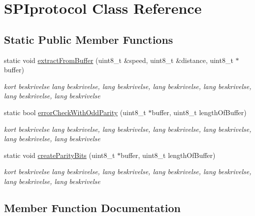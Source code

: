 \hypertarget{classSPIprotocol}{}\section{S\+P\+Iprotocol Class Reference}
\label{classSPIprotocol}
\subsection*{Static Public Member Functions}
\begin{DoxyCompactItemize}
\item 
static void \hyperlink{classSPIprotocol_ac1337db66f7bbe18a20b05b5d620ad6e}{extract\+From\+Buffer} (uint8\+\_\+t \&speed, uint8\+\_\+t \&distance, uint8\+\_\+t $\ast$buffer)
\begin{DoxyCompactList}\small\item\em kort beskrivelse lang beskrivelse, lang beskrivelse, lang beskrivelse, lang beskrivelse, lang beskrivelse, lang beskrivelse \end{DoxyCompactList}\item 
static bool \hyperlink{classSPIprotocol_aa263c4525c227602aa55d0fe34cd2d0e}{error\+Check\+With\+Odd\+Parity} (uint8\+\_\+t $\ast$buffer, uint8\+\_\+t length\+Of\+Buffer)
\begin{DoxyCompactList}\small\item\em kort beskrivelse lang beskrivelse, lang beskrivelse, lang beskrivelse, lang beskrivelse, lang beskrivelse, lang beskrivelse \end{DoxyCompactList}\item 
static void \hyperlink{classSPIprotocol_acaad712748b9671d4d5537ce27d3ecc6}{create\+Parity\+Bits} (uint8\+\_\+t $\ast$buffer, uint8\+\_\+t length\+Of\+Buffer)
\begin{DoxyCompactList}\small\item\em kort beskrivelse lang beskrivelse, lang beskrivelse, lang beskrivelse, lang beskrivelse, lang beskrivelse, lang beskrivelse \end{DoxyCompactList}\end{DoxyCompactItemize}


\subsection{Member Function Documentation}
\mbox{\label{classSPIprotocol_acaad712748b9671d4d5537ce27d3ecc6}} 
